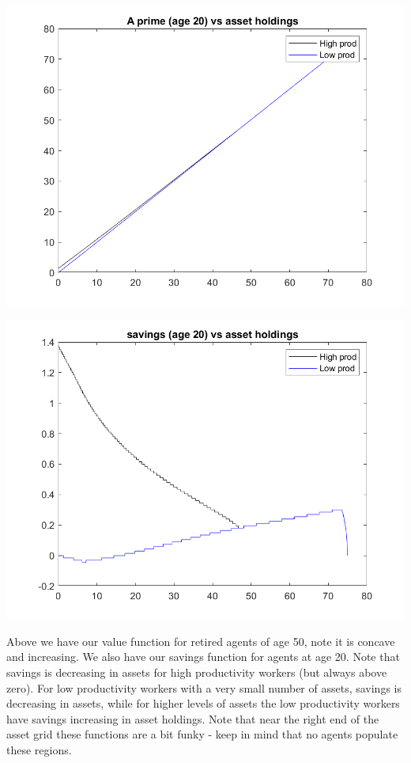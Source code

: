 \documentclass[11pt]{article} %
\begin{document}
\includegraphics{apr}

\includegraphics{savings}

Above we have our value function for retired agents of age 50, note it is concave and increasing. We also have our savings function for agents at age 20. Note that savings is decreasing in assets for high productivity workers (but always above zero). For low productivity workers with a very small number of assets, savings is decreasing in assets, while for higher levels of assets the low productivity workers have savings increasing in asset holdings. Note that near the right end of the asset grid these functions are a bit funky - keep in mind that no agents populate these regions.
\end{document}
